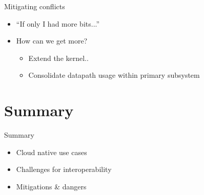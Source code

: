 \documentclass[black,white,aspectratio=169]{beamer}
\DeclareRobustCommand{\#}{\adjustbox{valign=B,totalheight=.57\baselineskip}{\oldhash}}%
\newcommand\todo[1]{
    \textcolor{red}{#1}
}
\begin{document}
    \begin{frame}{Mitigating conflicts}
        \begin{itemize}
            \item ``If only I had more bits...''~\medskip
            \item How can we get more?~\smallskip
            \begin{itemize}
                \item Extend the kernel..~\smallskip
                \item Consolidate datapath usage within primary subsystem~\medskip
            \end{itemize}
        \end{itemize}
    \end{frame}

    \section*{Summary}
    \begin{frame}{Summary}
        \begin{itemize}
            \item Cloud native use cases~\medskip
            \item Challenges for interoperability~\medskip
            \item Mitigations \& dangers~\medskip
        \end{itemize}
    \end{frame}
\end{document}
